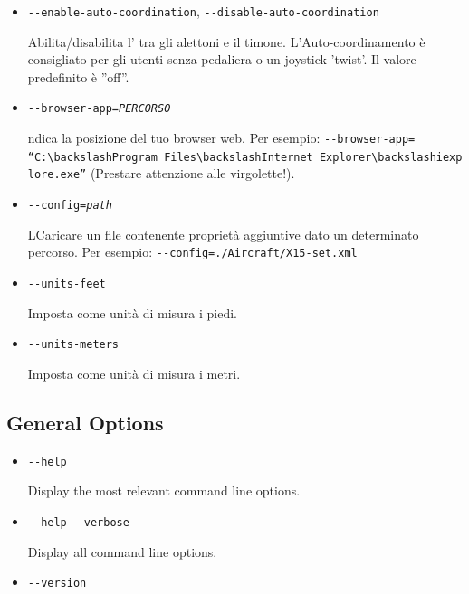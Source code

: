 \begin{itemize}
{\begin{itemize}
  \item{\texttt{-$ $-enable-auto-coordination}, \texttt{-$ $-disable-auto-coordination}}

    Abilita/disabilita l' tra gli alettoni e il timone.
    L'Auto-coordinamento \`{e} consigliato per gli utenti senza pedaliera
    o un joystick 'twist'. Il valore predefinito \`{e} ''off''.

  \item{\texttt{-$ $-browser-app={\it PERCORSO}}}

    ndica la posizione del tuo browser web. Per esempio:
    \texttt{-$ $-browser-app=}\\
    \texttt{``C:$\backslash$Program~Files$\backslash$Internet~Explorer$\backslash$iexplore.exe''}
    (Prestare attenzione alle virgolette!).

  \item{\texttt{-$ $-config={\it path}}}

    LCaricare un file contenente propriet\`{a} aggiuntive dato un determinato percorso. Per esempio:
    \texttt{-$ $-config=./Aircraft/X15-set.xml}

  \item{\texttt{-$ $-units-feet}}

    Imposta come unit\`{a} di misura i piedi.

  \item{\texttt{-$ $-units-meters}}

    Imposta come unit\`{a} di misura i metri.


  \end{itemize}
}
{
  \subsection{General Options}\label{generaloptions}
  \begin{itemize}
  \item{\texttt{-$ $-help}}

    Display the most relevant command line options.

  \item{\texttt{-$ $-help} \texttt{-$ $-verbose}}

    Display all command line options.

  \item{\texttt{-$ $-version} }


\end{itemize}}
\end{itemize}
